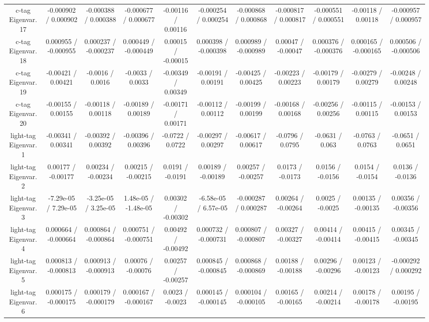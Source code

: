 \begin{table}[htbp]
\begin{center}
\begin{tabular}{|c|c|c|c|c|c|c|c|c|c|c|}
  c-tag Eigenvar. 17 & -0.000902 / 0.000902 & -0.000388 / 0.000388 & -0.000677 / 0.000677 & -0.00116 / 0.00116 & -0.000254 / 0.000254 & -0.000868 / 0.000868 & -0.000817 / 0.000817 & -0.000551 / 0.000551 & -0.00118 / 0.00118 & -0.000957 / 0.000957 \\ 
  c-tag Eigenvar. 18 & 0.000955 / -0.000955 & 0.000237 / -0.000237 & 0.000449 / -0.000449 & 0.00015 / -0.00015 & 0.000398 / -0.000398 & 0.000989 / -0.000989 & 0.00047 / -0.00047 & 0.000376 / -0.000376 & 0.000165 / -0.000165 & 0.000506 / -0.000506 \\ 
  c-tag Eigenvar. 19 & -0.00421 / 0.00421 & -0.0016 / 0.0016 & -0.0033 / 0.0033 & -0.00349 / 0.00349 & -0.00191 / 0.00191 & -0.00425 / 0.00425 & -0.00223 / 0.00223 & -0.00179 / 0.00179 & -0.00279 / 0.00279 & -0.00248 / 0.00248 \\ 
  c-tag Eigenvar. 20 & -0.00155 / 0.00155 & -0.00118 / 0.00118 & -0.00189 / 0.00189 & -0.00171 / 0.00171 & -0.00112 / 0.00112 & -0.00199 / 0.00199 & -0.00168 / 0.00168 & -0.00256 / 0.00256 & -0.00115 / 0.00115 & -0.00153 / 0.00153 \\ 
  light-tag Eigenvar. 1 & -0.00341 / 0.00341 & -0.00392 / 0.00392 & -0.00396 / 0.00396 & -0.0722 / 0.0722 & -0.00297 / 0.00297 & -0.00617 / 0.00617 & -0.0796 / 0.0795 & -0.0631 / 0.063 & -0.0763 / 0.0763 & -0.0651 / 0.0651 \\ 
  light-tag Eigenvar. 2 & 0.00177 / -0.00177 & 0.00234 / -0.00234 & 0.00215 / -0.00215 & 0.0191 / -0.0191 & 0.00189 / -0.00189 & 0.00257 / -0.00257 & 0.0173 / -0.0173 & 0.0156 / -0.0156 & 0.0154 / -0.0154 & 0.0136 / -0.0136 \\ 
  light-tag Eigenvar. 3 & -7.29e-05 / 7.29e-05 & -3.25e-05 / 3.25e-05 & 1.48e-05 / -1.48e-05 & 0.00302 / -0.00302 & -6.58e-05 / 6.57e-05 & -0.000287 / 0.000287 & 0.00264 / -0.00264 & 0.0025 / -0.0025 & 0.00135 / -0.00135 & 0.00356 / -0.00356 \\ 
  light-tag Eigenvar. 4 & 0.000664 / -0.000664 & 0.000864 / -0.000864 & 0.000751 / -0.000751 & 0.00492 / -0.00492 & 0.000732 / -0.000731 & 0.000807 / -0.000807 & 0.00327 / -0.00327 & 0.00414 / -0.00414 & 0.00415 / -0.00415 & 0.00345 / -0.00345 \\ 
  light-tag Eigenvar. 5 & 0.000813 / -0.000813 & 0.000913 / -0.000913 & 0.00076 / -0.00076 & 0.00257 / -0.00257 & 0.000845 / -0.000845 & 0.000868 / -0.000869 & 0.00188 / -0.00188 & 0.00296 / -0.00296 & 0.00123 / -0.00123 & -0.000292 / 0.000292 \\ 
  light-tag Eigenvar. 6 & 0.000175 / -0.000175 & 0.000179 / -0.000179 & 0.000167 / -0.000167 & 0.0023 / -0.0023 & 0.000145 / -0.000145 & 0.000104 / -0.000105 & 0.00165 / -0.00165 & 0.00214 / -0.00214 & 0.00178 / -0.00178 & 0.00195 / -0.00195 \\ 

\end{tabular}
\end{center}
\end{table}
